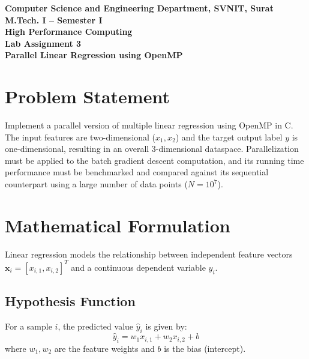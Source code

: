 \documentclass[12pt]{article}
\begin{document}

\begin{center}
\textbf{Computer Science and Engineering Department, SVNIT, Surat}\\
\textbf{M.Tech. I -- Semester I}\\
\textbf{High Performance Computing}\\
\textbf{Lab Assignment 3}\\
\textbf{Parallel Linear Regression using OpenMP}
\end{center}

\vspace{0.3cm}

\section{Problem Statement}
Implement a parallel version of multiple linear regression using OpenMP in C. The input features are two-dimensional ($x_1, x_2$) and the target output label $y$ is one-dimensional, resulting in an overall 3-dimensional dataspace. Parallelization must be applied to the batch gradient descent computation, and its running time performance must be benchmarked and compared against its sequential counterpart using a large number of data points ($N = 10^7$).

\section{Mathematical Formulation}
Linear regression models the relationship between independent feature vectors $\mathbf{x}_i = [x_{i,1}, x_{i,2}]^T$ and a continuous dependent variable $y_i$.

\subsection{Hypothesis Function}
For a sample $i$, the predicted value $\hat{y}_i$ is given by:
\begin{equation}
\hat{y}_i = w_1 x_{i,1} + w_2 x_{i,2} + b
\end{equation}
where $w_1, w_2$ are the feature weights and $b$ is the bias (intercept).
\end{document}
